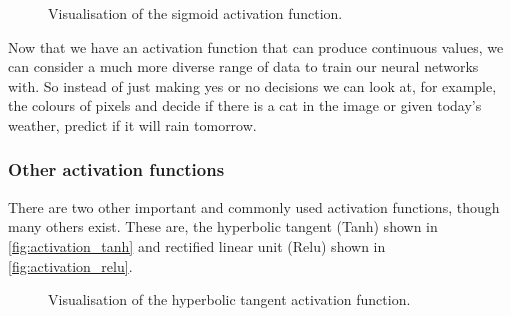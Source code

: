 \begin{figure}
\begin{center}
\caption{Visualisation of the sigmoid activation function.}
\label{fig:activation_sigmoid}
\end{center}
\end{figure}

Now that we have an activation function that can produce continuous values, we can consider a much more diverse range of data to train our neural networks with. So instead of just making yes or no decisions we can look at, for example, the colours of pixels and decide if there is a cat in the image or given today's weather, predict if it will rain tomorrow.

\subsubsection{Other activation functions}
There are two other important and commonly used activation functions, though many others exist. These are, the hyperbolic tangent (Tanh) shown in \autoref{fig:activation_tanh} and rectified linear unit (Relu)  shown in \autoref{fig:activation_relu}.

\begin{figure}
\begin{center}
\caption{Visualisation of the hyperbolic tangent activation function.}
\label{fig:activation_tanh}
\end{center}
\end{figure}

